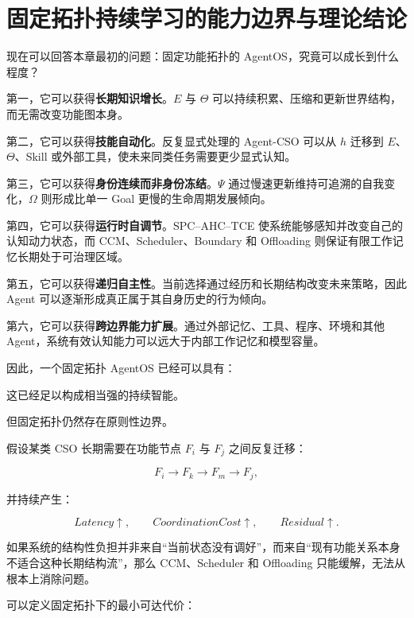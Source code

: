 \section{固定拓扑持续学习的能力边界与理论结论}

现在可以回答本章最初的问题：固定功能拓扑的 AgentOS，究竟可以成长到什么程度？

第一，它可以获得\textbf{长期知识增长}。$E$ 与 $\Theta$ 可以持续积累、压缩和更新世界结构，而无需改变功能图本身。

第二，它可以获得\textbf{技能自动化}。反复显式处理的 Agent-CSO 可以从 $h$ 迁移到 $E$、$\Theta$、Skill 或外部工具，使未来同类任务需要更少显式认知。

第三，它可以获得\textbf{身份连续而非身份冻结}。$\Psi$ 通过慢速更新维持可追溯的自我变化，$\Omega$ 则形成比单一 Goal 更慢的生命周期发展倾向。

第四，它可以获得\textbf{运行时自调节}。SPC--AHC--TCE 使系统能够感知并改变自己的认知动力状态，而 CCM、Scheduler、Boundary 和 Offloading 则保证有限工作记忆长期处于可治理区域。

第五，它可以获得\textbf{递归自主性}。当前选择通过经历和长期结构改变未来策略，因此 Agent 可以逐渐形成真正属于其自身历史的行为倾向。

第六，它可以获得\textbf{跨边界能力扩展}。通过外部记忆、工具、程序、环境和其他 Agent，系统有效认知能力可以远大于内部工作记忆和模型容量。

因此，一个固定拓扑 AgentOS 已经可以具有：

\begin{statementbox}
\centering
{}
\end{statementbox}

这已经足以构成相当强的持续智能。

但固定拓扑仍然存在原则性边界。

假设某类 CSO 长期需要在功能节点 $F_i$ 与 $F_j$ 之间反复迁移：

\[
F_i
\rightarrow
F_k
\rightarrow
F_m
\rightarrow
F_j,
\]

并持续产生：

\[
Latency\uparrow,
\qquad
CoordinationCost\uparrow,
\qquad
Residual\uparrow.
\]

如果系统的结构性负担并非来自“当前状态没有调好”，而来自“现有功能关系本身不适合这种长期结构流”，那么 CCM、Scheduler 和 Offloading 只能缓解，无法从根本上消除问题。

可以定义固定拓扑下的最小可达代价：


